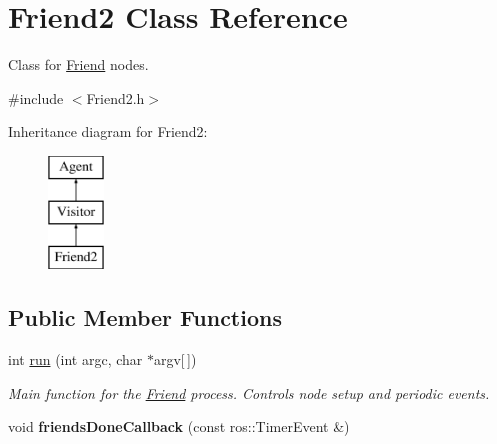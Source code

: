 \hypertarget{classFriend2}{\section{Friend2 Class Reference}
\label{classFriend2}
}


Class for \hyperlink{classFriend}{Friend} nodes.  




{\ttfamily \#include $<$Friend2.\-h$>$}

Inheritance diagram for Friend2\-:\begin{figure}[H]
\begin{center}
\leavevmode
\includegraphics[height=3.000000cm]{classFriend2}
\end{center}
\end{figure}
\subsection*{Public Member Functions}
\begin{DoxyCompactItemize}
\item 
\hypertarget{classFriend2_ad03c02e64256ea572ca3dfbf4bba0d0e}{int \hyperlink{classFriend2_ad03c02e64256ea572ca3dfbf4bba0d0e}{run} (int argc, char $\ast$argv\mbox{[}$\,$\mbox{]})}\label{classFriend2_ad03c02e64256ea572ca3dfbf4bba0d0e}

\begin{DoxyCompactList}\small\item\em Main function for the \hyperlink{classFriend}{Friend} process. Controls node setup and periodic events. \end{DoxyCompactList}\item 
\hypertarget{classFriend2_a4d8cfc5c44393e2353349197894d8393}{void {\bfseries friends\-Done\-Callback} (const ros\-::\-Timer\-Event \&)}\label{classFriend2_a4d8cfc5c44393e2353349197894d8393}

\end{DoxyCompactItemize}

